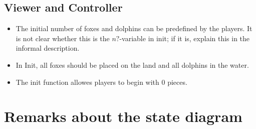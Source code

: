 \documentclass[a4paper,11pt]{article}
\begin{document}
    \subsection{Viewer and Controller}
    \begin{itemize}
        \item The initial number of foxes and dolphins can be predefined by the players. It is not clear whether this is the $n?$-variable in init; if it is, explain this in the informal description.
        \item In Init, all foxes should be placed on the land and all dolphins in the water.
        \item The init function allowes players to begin with 0 pieces.
    \end{itemize}

	\section{Remarks about the state diagram}
\end{document}
